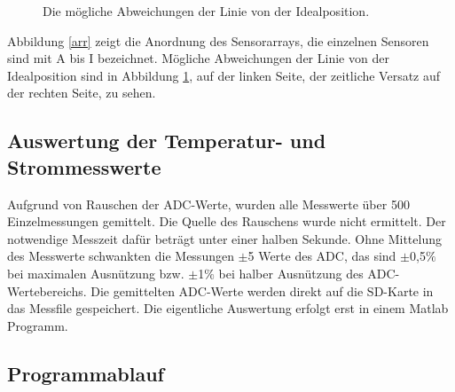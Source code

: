 \documentclass[a4paper,bibtotoc,oneside]{scrbook}
\begin{document}
\begin{figure}
\centering
\caption{Die mögliche Abweichungen der Linie von der Idealposition.}
\label{abw}
\end{figure} 

Abbildung \ref{arr} zeigt die Anordnung des Sensorarrays, die einzelnen Sensoren sind mit A bis I bezeichnet. Mögliche Abweichungen der Linie von der Idealposition sind in Abbildung \ref{abw}, auf der linken Seite, der zeitliche Versatz auf der rechten Seite, zu sehen.

\subsection{Auswertung der Temperatur- und Strommesswerte}\thispagestyle{empty}
Aufgrund von Rauschen der ADC-Werte, wurden alle Messwerte über 500 Einzelmessungen gemittelt. Die Quelle des Rauschens wurde nicht ermittelt. Der notwendige Messzeit dafür beträgt unter einer halben Sekunde. Ohne Mittelung des Messwerte schwankten die Messungen $\pm$5 Werte des ADC, das sind $\pm$0,5$\%$ bei maximalen Ausnützung bzw. $\pm$1$\%$ bei halber Ausnützung des ADC-Wertebereichs. Die gemittelten ADC-Werte werden direkt auf die SD-Karte in das Messfile gespeichert. Die eigentliche Auswertung erfolgt erst in einem Matlab Programm.
 
\subsection{Programmablauf}\thispagestyle{empty}
\end{document}
